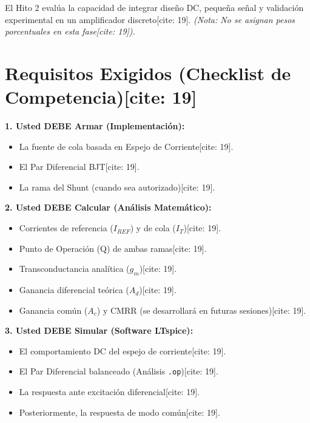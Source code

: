 \documentclass[11pt, a4paper]{article}
\begin{document}
\begin{tcolorbox}[colback=ucbblue!5, colframe=ucbblue, title=\textbf{Comunicación de Evaluación (Entregables) — Hito 2}]
    El Hito 2 evalúa la capacidad de integrar diseño DC, pequeña señal y validación experimental en un amplificador discreto[cite: 19]. \textit{(Nota: No se asignan pesos porcentuales en esta fase[cite: 19]).}
\end{tcolorbox}

\section*{Requisitos Exigidos (Checklist de Competencia)[cite: 19]}

\textbf{1. Usted DEBE Armar (Implementación):}
\begin{itemize}
    \item La fuente de cola basada en Espejo de Corriente[cite: 19].
    \item El Par Diferencial BJT[cite: 19].
    \item La rama del Shunt (cuando sea autorizado)[cite: 19].
\end{itemize}

\textbf{2. Usted DEBE Calcular (Análisis Matemático):}
\begin{itemize}
    \item Corrientes de referencia ($I_{REF}$) y de cola ($I_T$)[cite: 19].
    \item Punto de Operación (Q) de ambas ramas[cite: 19].
    \item Transconductancia analítica ($g_m$)[cite: 19].
    \item Ganancia diferencial teórica ($A_d$)[cite: 19].
    \item Ganancia común ($A_c$) y CMRR (se desarrollará en futuras sesiones)[cite: 19].
\end{itemize}

\textbf{3. Usted DEBE Simular (Software LTspice):}
\begin{itemize}
    \item El comportamiento DC del espejo de corriente[cite: 19].
    \item El Par Diferencial balanceado (Análisis \texttt{.op})[cite: 19].
    \item La respuesta ante excitación diferencial[cite: 19].
    \item Posteriormente, la respuesta de modo común[cite: 19].
\end{itemize}
\end{document}
